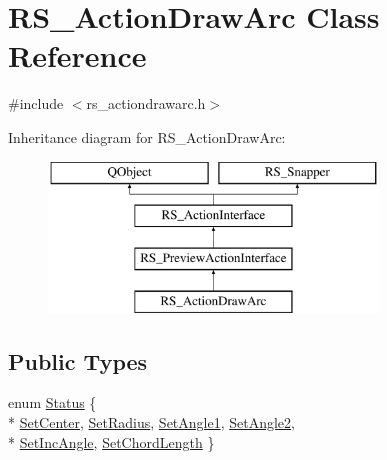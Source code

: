 \hypertarget{classRS__ActionDrawArc}{\section{R\-S\-\_\-\-Action\-Draw\-Arc Class Reference}
\label{classRS__ActionDrawArc}
}


{\ttfamily \#include $<$rs\-\_\-actiondrawarc.\-h$>$}

Inheritance diagram for R\-S\-\_\-\-Action\-Draw\-Arc\-:\begin{figure}[H]
\begin{center}
\leavevmode
\includegraphics[height=4.000000cm]{classRS__ActionDrawArc}
\end{center}
\end{figure}
\subsection*{Public Types}
\begin{DoxyCompactItemize}
\item 
enum \hyperlink{classRS__ActionDrawArc_a160ae379fa90db54ae6d365c0915eef1}{Status} \{ \\*
\hyperlink{classRS__ActionDrawArc_a160ae379fa90db54ae6d365c0915eef1ab2004598fc140be79fa690e9f21bfa3b}{Set\-Center}, 
\hyperlink{classRS__ActionDrawArc_a160ae379fa90db54ae6d365c0915eef1a0e57b9ab52ded562aeca1e97fe6b2a0f}{Set\-Radius}, 
\hyperlink{classRS__ActionDrawArc_a160ae379fa90db54ae6d365c0915eef1a9d53fd3d2385376bf50c48caa62e1ce1}{Set\-Angle1}, 
\hyperlink{classRS__ActionDrawArc_a160ae379fa90db54ae6d365c0915eef1a7c815466df4a1067d537fab4f4a92c67}{Set\-Angle2}, 
\\*
\hyperlink{classRS__ActionDrawArc_a160ae379fa90db54ae6d365c0915eef1a01e77ad57ad067f744b9464a6ca0a42d}{Set\-Inc\-Angle}, 
\hyperlink{classRS__ActionDrawArc_a160ae379fa90db54ae6d365c0915eef1aa9d8a98c4f4db74f78aabb3e4506f5ef}{Set\-Chord\-Length}
 \}
\end{DoxyCompactItemize}

